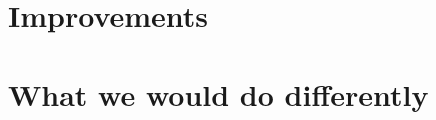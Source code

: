 \section{Improvements}\label{sec:improvements}


\section{What we would do differently}\label{sec:do-differently}

